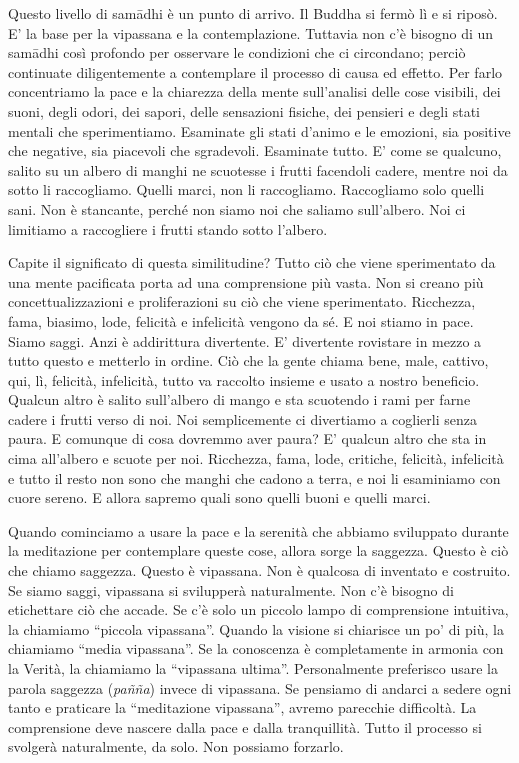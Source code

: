 Questo livello di samādhi è un punto di arrivo. Il Buddha si fermò lì e
si riposò. E' la base per la vipassana e la contemplazione. Tuttavia non
c'è bisogno di un samādhi così profondo per osservare le condizioni che
ci circondano; perciò continuate diligentemente a contemplare il
processo di causa ed effetto. Per farlo concentriamo la pace e la
chiarezza della mente sull'analisi delle cose visibili, dei suoni, degli
odori, dei sapori, delle sensazioni fisiche, dei pensieri e degli stati
mentali che sperimentiamo. Esaminate gli stati d'animo e le emozioni,
sia positive che negative, sia piacevoli che sgradevoli. Esaminate
tutto. E' come se qualcuno, salito su un albero di manghi ne scuotesse i
frutti facendoli cadere, mentre noi da sotto li raccogliamo. Quelli
marci, non li raccogliamo. Raccogliamo solo quelli sani. Non è
stancante, perché non siamo noi che saliamo sull'albero. Noi ci
limitiamo a raccogliere i frutti stando sotto l'albero.

Capite il significato di questa similitudine? Tutto ciò che viene
sperimentato da una mente pacificata porta ad una comprensione più
vasta. Non si creano più concettualizzazioni e proliferazioni su ciò che
viene sperimentato. Ricchezza, fama, biasimo, lode, felicità e
infelicità vengono da sé. E noi stiamo in pace. Siamo saggi. Anzi è
addirittura divertente. E' divertente rovistare in mezzo a tutto questo
e metterlo in ordine. Ciò che la gente chiama bene, male, cattivo, qui,
lì, felicità, infelicità, tutto va raccolto insieme e usato a nostro
beneficio. Qualcun altro è salito sull'albero di mango e sta scuotendo i
rami per farne cadere i frutti verso di noi. Noi semplicemente ci
divertiamo a coglierli senza paura. E comunque di cosa dovremmo aver
paura? E' qualcun altro che sta in cima all'albero e scuote per noi.
Ricchezza, fama, lode, critiche, felicità, infelicità e tutto il resto
non sono che manghi che cadono a terra, e noi li esaminiamo con cuore
sereno. E allora sapremo quali sono quelli buoni e quelli marci.


Quando cominciamo a usare la pace e la serenità che abbiamo sviluppato
durante la meditazione per contemplare queste cose, allora sorge la
saggezza. Questo è ciò che chiamo saggezza. Questo è vipassana. Non è
qualcosa di inventato e costruito. Se siamo saggi, vipassana si
svilupperà naturalmente. Non c'è bisogno di etichettare ciò che accade.
Se c'è solo un piccolo lampo di comprensione intuitiva, la chiamiamo
``piccola vipassana''. Quando la visione si chiarisce un po' di più, la
chiamiamo ``media vipassana''. Se la conoscenza è completamente in
armonia con la Verità, la chiamiamo la ``vipassana ultima''.
Personalmente preferisco usare la parola saggezza (\emph{pañña}) invece
di vipassana. Se pensiamo di andarci a sedere ogni tanto e praticare la
``meditazione vipassana'', avremo parecchie difficoltà. La comprensione
deve nascere dalla pace e dalla tranquillità. Tutto il processo si
svolgerà naturalmente, da solo. Non possiamo forzarlo.

